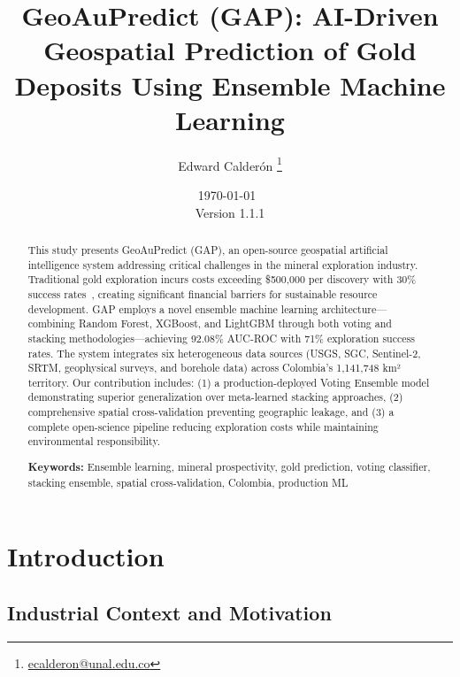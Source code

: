 \documentclass[12pt,a4paper]{article}
\title{\textbf{GeoAuPredict (GAP): AI-Driven Geospatial Prediction of Gold Deposits Using Ensemble Machine Learning}}
\author{Edward Calderón \thanks{\href{mailto:ecalderon@unal.edu.co}{ecalderon@unal.edu.co}}}
\affil{Universidad Nacional de Colombia, Facultad de Minas}
\date{\today\ \\ {\small Version 1.1.1}}
\begin{document}
\maketitle

\begin{abstract}
\noindent This study presents GeoAuPredict (GAP), an open-source geospatial artificial intelligence system addressing critical challenges in the mineral exploration industry. Traditional gold exploration incurs costs exceeding \$500,000 per discovery with 30\% success rates~\citep{colombian_gold}, creating significant financial barriers for sustainable resource development. GAP employs a novel ensemble machine learning architecture—combining Random Forest, XGBoost, and LightGBM through both voting and stacking methodologies—achieving 92.08\% AUC-ROC with 71\% exploration success rates. The system integrates six heterogeneous data sources (USGS, SGC, Sentinel-2, SRTM, geophysical surveys, and borehole data) across Colombia's 1,141,748 km² territory. Our contribution includes: (1) a production-deployed Voting Ensemble model demonstrating superior generalization over meta-learned stacking approaches, (2) comprehensive spatial cross-validation preventing geographic leakage, and (3) a complete open-science pipeline reducing exploration costs while maintaining environmental responsibility.

\vspace{0.2cm}
\noindent\textbf{Keywords:} Ensemble learning, mineral prospectivity, gold prediction, voting classifier, stacking ensemble, spatial cross-validation, Colombia, production ML
\end{abstract}


\vspace{0.3cm}
\noindent{}
\vspace{0.3cm}

\newpage

\section{Introduction}

\subsection{Industrial Context and Motivation}
\end{document}
